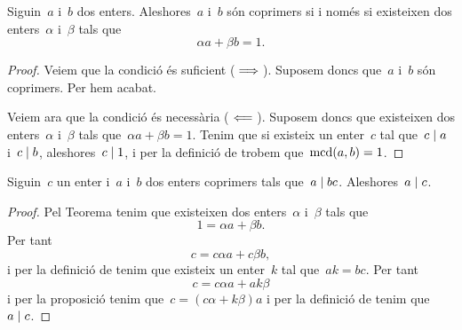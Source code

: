 \documentclass[../../main.tex]{subfiles}
\begin{document}
    \begin{theorem}
        \label{thm:condició equivalent a coprimers per Bézout}
        Siguin~\(a\) i~\(b\) dos enters.
        Aleshores~\(a\) i~\(b\) són coprimers si i només si existeixen dos enters~\(\alpha\) i~\(\beta\) tals que
        \[
            \alpha a+\beta b=1.
        \]
        \begin{proof}
            Veiem que la condició és suficient (\(\implies\)).
            Suposem doncs que~\(a\) i~\(b\) són coprimers.
            Per  hem acabat.

            Veiem ara que la condició és necessària (\(\impliedby\)).
            Suposem doncs que existeixen dos enters~\(\alpha\) i~\(\beta\) tals que~\(\alpha a+\beta b=1\).
            Tenim que si existeix un enter~\(c\) tal que~\(c\mathrel{|} a\) i~\(c\mathrel{|} b\), aleshores~\(c\mathrel{|} 1\), i per la definició de  trobem que~\(\operatorname{mcd}(a,b)=1\).
        \end{proof}
    \end{theorem}
    \begin{proposition}
        \label{prop:un enter que divideix al producte de dos, on un n'és coprimer, divideix a l'altre}
        Siguin~\(c\) un enter i~\(a\) i~\(b\) dos enters coprimers tals que~\(a\mathrel{|} bc\).
        Aleshores~\(a\mathrel{|} c\).
        \begin{proof}
            Pel Teorema  tenim que existeixen dos enters~\(\alpha\) i~\(\beta\) tals que
            \[
                1=\alpha a+\beta b.
            \]
            Per tant
            \[
                c=c\alpha a+c\beta b,
            \]
            i per la definició de  tenim que existeix un enter~\(k\) tal que~\(ak=bc\).
            Per tant
            \[
                c=c\alpha a+ak\beta
            \]
            i per la proposició  tenim que~\(c=(c\alpha+k\beta)a\) i per la definició de  tenim que~\(a\mathrel{|} c\).
        \end{proof}
    \end{proposition}
\end{document}
